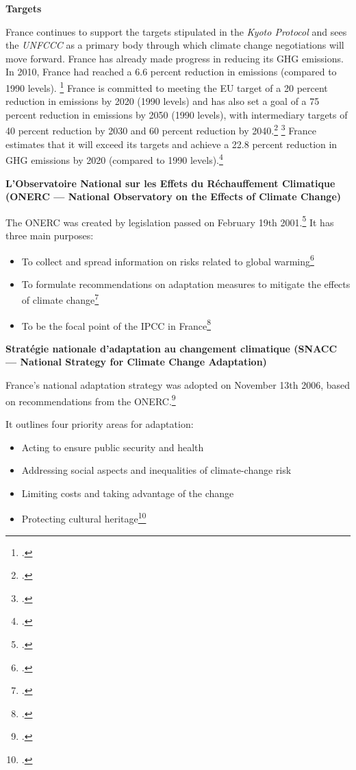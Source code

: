 \documentclass[10pt]{article}
\begin{document}
\textbf{Targets}



France continues to support the targets stipulated in the \emph{Kyoto Protocol} and sees the \emph{UNFCCC} as a primary body through which climate change negotiations will move forward. 
France has already made progress in reducing its GHG emissions. 
In 2010, France had reached a 6.6 percent reduction in emissions (compared to 1990 levels). \footcite[][]{FranceEmission}
France is committed to meeting the EU target of a 20 percent reduction in emissions by 2020 (1990 levels) and has also set a goal of a 75 percent reduction in emissions by 2050 (1990 levels), with intermediary targets of 40 percent reduction by 2030 and 60 percent reduction by 2040.\footcite[][]{Reduction2050} \footcite[][]{IntermediaryTargets}
France estimates that it will exceed its targets and achieve a 22.8 percent reduction in GHG emissions by 2020 (compared to 1990 levels).\footcite[][]{Reduction2020}



\textbf{L’Observatoire National sur les Effets du Réchauffement Climatique (ONERC --- National Observatory on the Effects of Climate Change)}



The ONERC was created by legislation passed on February 19th 2001.\footcite[][]{ONERC}
It has three main purposes:
\begin{itemize}
	\item To collect and spread information on risks related to global warming\footcite[][]{Reduction2020}
	\item To formulate recommendations on adaptation measures to mitigate the effects of climate change\footcite[][]{Reduction2020}
	\item To be the focal point of the IPCC in France\footcite[][]{ONERC}
\end{itemize}



\textbf{Stratégie nationale d’adaptation au changement climatique (SNACC --- National Strategy for Climate Change Adaptation)}



France's national adaptation strategy was adopted on November 13th 2006, based on recommendations from the ONERC.\footcite[][]{SNAAC}



It outlines four priority areas for adaptation:
\begin{itemize}
	\item Acting to ensure public security and health
	\item Addressing social aspects and inequalities of climate-change risk
	\item Limiting costs and taking advantage of the change
	\item Protecting cultural heritage\footcite[][]{SNAAC}
\end{itemize}
\end{document}
